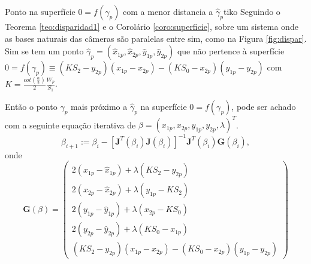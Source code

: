 \documentclass[a4paper,10pt]{article}
\begin{document}
\begin{corollarytcolorbox}{Ponto na superfície $0=f(\gamma_p)$ com a menor distancia a $\hat{\gamma}_p$}{tiko}
 Seguindo o Teorema \ref{teo:disparidad1} e o Corolário \ref{coro:superficie}, 
 sobre um sistema onde as bases naturais das câmeras
 são paralelas entre sim, como na Figura \ref{fig:dispar}. 
 Sim se tem um ponto $\hat{\gamma}_p=(\hat{x}_{1p},\hat{x}_{2p},\hat{y}_{1p},\hat{y}_{2p})$ 
 que não pertence  à superfície $0=f(\gamma_p)\equiv (KS_2-y_{2p})(x_{1p}-x_{2p})-(KS_0-x_{2p})(y_{1p}-y_{2p})$
 com $K=\frac{cot(\frac{\alpha}{2})}{2}\frac{W_p}{S_1}$. 
 
 Então o ponto  $\gamma_p$ mais próximo a $\hat{\gamma}_p$ na superfície  $0=f(\gamma_p)$, pode ser achado
 com a seguinte equação iterativa de $\beta=(x_{1p},x_{2p},y_{1p},y_{2p},\lambda)^T$.
 \begin{equation}\label{eq:t1}
 \beta_{i+1} := \beta_{i} - \left [ \mathbf{J}^T(\beta_i) \mathbf{J}(\beta_i) \right ]^{-1} \mathbf{J}^T(\beta_i) \mathbf{G}(\beta_i),
 \end{equation}
 onde 
\begin{equation}\label{eq:t3}
 \mathbf{G}(\beta)=\left(
 \begin{matrix}
 2(x_{1p}-\hat{x}_{1p})+ \lambda (K S_2 -y_{2p})\\
 2(x_{2p}-\hat{x}_{2p})+ \lambda ( y_{1p} - K S_2)\\
 2(y_{1p}-\hat{y}_{1p})+ \lambda (x_{2p} - K S_0)\\
 2(y_{2p}-\hat{y}_{2p})+ \lambda ( K S_0 - x_{1p})\\
 (KS_2-y_{2p})(x_{1p}-x_{2p})-(KS_0-x_{2p})(y_{1p}-y_{2p})
 \end{matrix} 
 \right)
\end{equation} 
 

\end{corollarytcolorbox}
\end{document}
